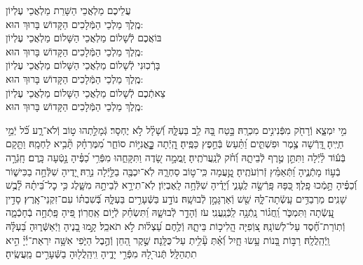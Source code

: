 \documentclass[twoside, openany, parskip=half, 11pt]{book}
\begin{document}
\birkashabonim

\medskip



עֲלֵיכֶם מַלְאֲכֵי הַשָּׁרֵת מַלְאֲכֵי עֶלְיוֹן\\ מֶֽלֶךְ מַלְכֵי הַמְּֿלָכִים הַקָּדוֹשׁ בָּרוּךְ הוּא: \\
בּוֹאֲכֶם לְֿשָׁלוֹם מַלְאֲכֵי הַשָּׁלוֹם מַלְאֲכֵי עֶלְיוֹן\\ מֶֽלֶךְ מַלְכֵי הַמְּֿלָכִים הַקָּדוֹשׁ בָּרוּךְ הוּא:\\
בָּרְֿכֽוּנִי לְֿשָׁלוֹם מַלְאֲכֵי הַשָּׁלוֹם מַלְאֲכֵי עֶלְיוֹן \\ מֶֽלֶךְ מַלְכֵי הַמְּֿלָכִים הַקָּדוֹשׁ בָּרוּךְ הוּא:\\
צֵאתְֿכֶם לְֿשָׁלוֹם מַלְאֲכֵי הַשָּׁלוֹם מַלְאֲכֵי עֶלְיוֹן\\ מֶֽלֶךְ מַלְכֵי הַמְּֿלָכִים הַקָּדוֹשׁ בָּרוּךְ הוּא:

\vfill
\clearpage


מִ֣י יִמְצָ֑א וְֿרָחֹ֖ק מִפְּֿנִינִ֣ים מִכְרָֽהּ׃ \hfill \break
בָּ֣טַח בָּ֭הּ לֵ֥ב בַּעְלָּ֑הּ וְֿ֝שָׁלָ֗ל לֹ֣א יֶחְסָר׃ \hfill \break
גְּֿמָלַ֣תְהוּ ט֣וֹב וְֿלֹא־רָ֑ע כֹּ֝֗ל יְֿמֵ֣י חַיֶּֽיהָ׃ \hfill \break
דָּֽ֭רְֿשָׁה צֶ֥מֶר וּפִשְׁתִּ֑ים וַ֝תַּ֗עַשׂ בְּֿחֵ֣פֶץ כַּפֶּֽיהָ׃ \hfill \break
הָֽ֭יְֿתָה כׇׇׇׇׇׇׇׇָּֽאֳנִיּ֣וֹת סוֹחֵ֑ר מִ֝מֶּרְחָ֗ק תָּ֘בִ֥יא לַחְמָֽהּ׃ \hfill \break
וַתָּ֤קָם בְּֿע֬וֹד לַ֗יְֿלָה וַתִּתֵּ֣ן טֶ֣רֶף לְֿבֵיתָ֑הּ וְֿ֝חֹ֗ק לְֿנַֽעֲרֹתֶֽיהָ׃ \hfill \break
זָֽמֲמָ֣ה שָׂ֭דֶה וַתִּקָּחֵ֑הוּ מִפְּֿרִ֥י כַ֝פֶּ֗יהָ נָ֣טְֿעָה כָּֽרֶם׃ \hfill \break
חָֽגְֿרָ֣ה בְֿע֣וֹז מָתְֿנֶ֑יהָ וַ֝תְּֿאַמֵּ֗ץ זְֿרוֹֽעֹתֶֽיהָ׃ \hfill \break
טָֽ֣֭עֲמָה כִּֽי־ט֣וֹב סַחְרָ֑הּ לֹֽא־יִכְבֶּ֖ה בַלַּ֣יְֿלָה נֵרָֽהּ׃ \hfill \break
יָ֭דֶיהָ שִׁלְּֿחָ֣ה בַכִּישׁ֑וֹר וְֿ֝כַפֶּ֗יהָ תָּ֣מְֿכוּ פָֽלֶךְ׃ \hfill \break
כַּ֭פָּהּ פָּֽרְֿשָׂ֣ה לֶֽעָנִ֑י וְֿ֝יָדֶ֗יהָ שִׁלְּֿחָ֥ה לָֽאֶבְיֽוֹן׃ \hfill \break
לֹֽא־תִירָ֣א לְֿבֵיתָ֣הּ מִשָּׁ֑לֶג כִּ֥י כׇל־בֵּ֝יתָ֗הּ לָ֘בֻ֥שׁ שָׁנִֽים׃ \hfill \break
מַרְבַדִּ֥ים עָֽשְֿׂתָה־לָּ֑הּ שֵׁ֖שׁ וְֿאַרְגָּמָ֣ן לְֿבוּשָֽׁהּ׃ \hfill \break
נוֹדָ֣ע בַּשְּֿׁעָרִ֣ים בַּעְלָּ֑הּ בְּֿ֝שִׁבְתּ֗וֹ עִם־זִקְנֵי־אָֽרֶץ׃ \hfill \break
סָדִ֣ין עָֽ֭שְֿׂתָה וַתִּמְכֹּ֑ר וַֽ֝חֲג֗וֹר נָֽתְֿנָ֥ה לַֽכְּֿנַֽעֲנִֽי׃ \hfill \break
עֹז וְֿהָדָ֣ר לְֿבוּשָׁ֑הּ וַ֝תִּשְׂחַ֗ק לְֿי֣וֹם אַֽחֲרֽוֹן׃ \hfill \break
פִּ֭יהָ פָּֽתְֿחָ֣ה בְֿחָכְֿמָ֑ה וְֿתֽוֹרַת־חֶ֝֗סֶד עַל־לְשׁוֹנָֽהּ׃ \hfill \break
צ֭וֹֽפִיָּה הֲֽלִיכ֣וֹת בֵּיתָ֑הּ וְֿלֶ֥חֶם עַ֝צְל֗וּת לֹ֣א תֹאכֵֽל׃ \hfill \break
קָ֣מוּ בָ֭נֶיהָ וַיְֿאַשְּֿׁר֑וּהָ בַּ֝עְלָּ֗הּ וַֽיְֿהַֽלֲלָֽהּ׃ \hfill \break
רַבּ֣וֹת בָּ֭נוֹת עָ֥שׂוּ חָ֑יִל וְֿ֝אַ֗תְּ עָ֘לִ֥יתְ עַל־כֻּלָּֽנָה׃ \hfill \break
שֶׁ֣קֶר הַ֭חֵן וְֿהֶ֣בֶל הַיֹּ֑פִי אִשָּׁ֥ה יִרְאַת־יְֿ֜יָ֗ הִ֣יא תִתְהַלָּֽל׃\hfill \break
תְּֽֿנוּ־לָ֭הּ מִפְּֿרִ֣י יָדֶ֑יהָ וִֽיהַֽלֲל֖וּהָ בַשְּֿׁעָרִ֣ים מַֽעֲשֶֽׂיהָ׃\hfill \break
\end{document}
